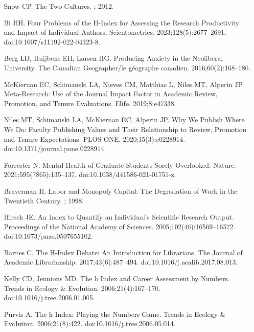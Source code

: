 \documentclass[
  10pt,
  letterpaper,
]{article}
\begin{document}
\begin{thebibliography}{10}
Snow CP.
\newblock The Two Cultures.
; 2012.

Bi HH.
\newblock Four Problems of the H-Index for Assessing the Research Productivity and Impact of Individual Authors.
\newblock Scientometrics. 2023;128(5):2677--2691.
\newblock doi:{10.1007/s11192-022-04323-8}.

Berg LD, Huijbens EH, Larsen HG.
\newblock Producing Anxiety in the Neoliberal University.
\newblock The Canadian Geographer/le g\'eographe canadien. 2016;60(2):168--180.

McKiernan EC, Schimanski LA, Nieves CM, Matthias L, Niles MT, Alperin JP.
\newblock Meta-Research: {{Use}} of the Journal Impact Factor in Academic Review, Promotion, and Tenure Evaluations.
\newblock Elife. 2019;8:e47338.

Niles MT, Schimanski LA, McKiernan EC, Alperin JP.
\newblock Why We Publish Where We Do: {{Faculty}} Publishing Values and Their Relationship to Review, Promotion and Tenure Expectations.
\newblock PLOS ONE. 2020;15(3):e0228914.
\newblock doi:{10.1371/journal.pone.0228914}.

Forrester N.
\newblock Mental Health of Graduate Students Sorely Overlooked.
\newblock Nature. 2021;595(7865):135--137.
\newblock doi:{10.1038/d41586-021-01751-z}.

Braverman H.
\newblock Labor and Monopoly Capital: {{The}} Degradation of Work in the Twentieth Century.
; 1998.

Hirsch JE.
\newblock An Index to Quantify an Individual's Scientific Research Output.
\newblock Proceedings of the National Academy of Sciences. 2005;102(46):16569--16572.
\newblock doi:{10.1073/pnas.0507655102}.

Barnes C.
\newblock The H-Index {{Debate}}: {{An Introduction}} for {{Librarians}}.
\newblock The Journal of Academic Librarianship. 2017;43(6):487--494.
\newblock doi:{10.1016/j.acalib.2017.08.013}.

Kelly CD, Jennions MD.
\newblock The h Index and Career Assessment by Numbers.
\newblock Trends in Ecology \& Evolution. 2006;21(4):167--170.
\newblock doi:{10.1016/j.tree.2006.01.005}.

Purvis A.
\newblock The h Index: Playing the Numbers Game.
\newblock Trends in Ecology \& Evolution. 2006;21(8):422.
\newblock doi:{10.1016/j.tree.2006.05.014}.


\end{thebibliography}
\end{document}
